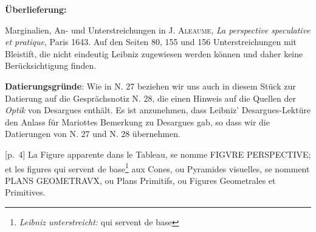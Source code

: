       
               
                \begin{ledgroupsized}[r]{120mm}
                \footnotesize 
                \pstart                
                \noindent\textbf{\"{U}berlieferung:}   
                \pend
                \end{ledgroupsized}
            
              
                            \begin{ledgroupsized}[r]{114mm}
                            \footnotesize 
                            \pstart \parindent -6mm
                            Marginalien, An- und Unterstreichungen in \textsc{J. Aleaume}, \cite{00003}\textit{La perspective speculative et pratique}, Paris 1643. Auf den Seiten 80, 155 und 156 Unterstreichungen mit Bleistift, die nicht eindeutig Leibniz zugewiesen werden k\"{o}nnen und daher keine Ber\"{u}cksichtigung finden. \pend
                            \end{ledgroupsized}
                \vspace*{5mm}
                \begin{ledgroup}
                \footnotesize 
                \pstart
            \noindent\footnotesize{\textbf{Datierungsgr\"{u}nde}: Wie in N. 27 beziehen wir uns auch in diesem St\"{u}ck zur Datierung auf die Gespr\"{a}chsnotiz N. 28, die einen Hinweis auf die Quellen der \cite{00034}\textit{Optik} von Desargues\protect{} enth\"{a}lt. Es ist anzunehmen, dass Leibniz' Desargues-Lekt\"{u}re den Anlass f\"{u}r Mariottes\protect{} Bemerkung zu Desargues\protect{} gab, so dass wir die Datierungen von N. 27 und N. 28 \"{u}bernehmen.}
                \pend
                \end{ledgroup}
            
                \vspace*{8mm}
                \pstart 
                \normalsize
            [p.~4] La Figure apparente dans le Tableau, se nomme FIGVRE PERSPECTIVE; et les figures qui servent de base\footnote{\textit{Leibniz unterstreicht:} qui servent de base} aux Cones, ou Pyramides visuelles\protect{}, se nomment PLANS GEOMETRAVX, ou Plans Primitifs, ou Figures Geometrales et Primitives.
